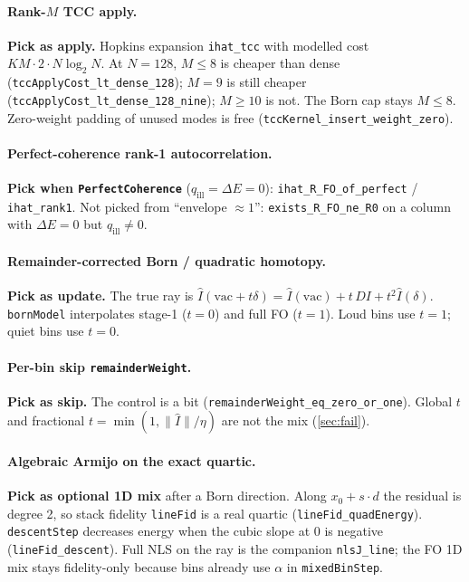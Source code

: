 \documentclass[11pt,a4paper]{article}
\theoremstyle{definition}
\theoremstyle{remark}
\newcommand{\norm}[1]{\lVert#1\rVert}
\begin{document}
\paragraph{Rank-$M$ TCC apply.}
\textbf{Pick as apply.} Hopkins expansion \texttt{ihat\_tcc} with
modelled cost $KM\cdot 2\cdot N\log_2 N$.
At $N=128$, $M\le 8$ is cheaper than dense
(\texttt{tccApplyCost\_lt\_dense\_128}); $M=9$ is still cheaper
(\texttt{tccApplyCost\_lt\_dense\_128\_nine}); $M\ge 10$ is not.
The Born cap stays $M\le 8$.
Zero-weight padding of unused modes is free
(\texttt{tccKernel\_insert\_weight\_zero}).

\paragraph{Perfect-coherence rank-1 autocorrelation.}
\textbf{Pick when \texttt{PerfectCoherence}} ($q_{\mathrm{ill}}=\Delta E=0$):
\texttt{ihat\_R\_FO\_of\_perfect} / \texttt{ihat\_rank1}.
Not picked from ``envelope $\approx 1$'': \texttt{exists\_R\_FO\_ne\_R0}
on a column with $\Delta E=0$ but $q_{\mathrm{ill}}\neq 0$.

\paragraph{Remainder-corrected Born / quadratic homotopy.}
\textbf{Pick as update.} The true ray is
$\hat I(\mathrm{vac}+t\delta)=\hat I(\mathrm{vac})+t\,DI+t^2\hat I(\delta)$.
\texttt{bornModel} interpolates stage-1 ($t=0$) and full FO ($t=1$).
Loud bins use $t=1$; quiet bins use $t=0$.

\paragraph{Per-bin skip \texttt{remainderWeight}.}
\textbf{Pick as skip.} The control is a bit
(\texttt{remainderWeight\_eq\_zero\_or\_one}).
Global $t$ and fractional $t=\min(1,\norm{\hat I}/\eta)$ are not the
mix (\cref{sec:fail}).

\paragraph{Algebraic Armijo on the exact quartic.}
\textbf{Pick as optional 1D mix} after a Born direction.
Along $x_0+s\cdot d$ the residual is degree 2, so stack fidelity
\texttt{lineFid} is a real quartic (\texttt{lineFid\_quadEnergy}).
\texttt{descentStep} decreases energy when the cubic slope at $0$ is
negative (\texttt{lineFid\_descent}).
Full NLS on the ray is the companion \texttt{nlsJ\_line}; the FO 1D
mix stays fidelity-only because bins already use $\alpha$ in
\texttt{mixedBinStep}.
\end{document}
